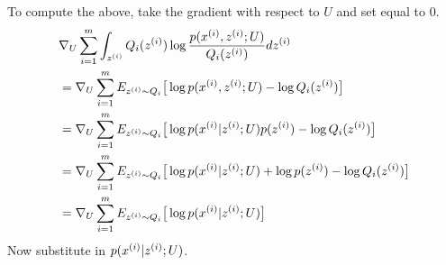 \documentclass[11pt]{article}
\begin{document}
To compute the above, take the gradient with respect to $U$ and set equal to $0$.
\begin{align*}
    &\nabla_U \sum_{i=1}^m \int_{z^{(i)}} Q_i(z^{(i)}) \log \frac{p(x^{(i)},z^{(i)}; U)}{Q_i(z^{(i)})} d z^{(i)} \\
    &= \nabla_U \sum_{i=1}^m E_{z^{(i)} \sim Q_i}\big[ \log p(x^{(i)},z^{(i)}; U) - \log Q_i(z^{(i)}) \big] \\
    &= \nabla_U \sum_{i=1}^m E_{z^{(i)} \sim Q_i}\big[ \log p(x^{(i)}|z^{(i)}; U) p(z^{(i)}) - \log Q_i(z^{(i)}) \big] \\
    &= \nabla_U \sum_{i=1}^m E_{z^{(i)} \sim Q_i}\big[ \log p(x^{(i)}|z^{(i)}; U) + \log p(z^{(i)}) - \log Q_i(z^{(i)}) \big] \\
    &= \nabla_U \sum_{i=1}^m E_{z^{(i)} \sim Q_i}\big[ \log p(x^{(i)}|z^{(i)}; U) \big] \\
\end{align*}
Now substitute in $p(x^{(i)}|z^{(i)}; U)$.
\end{document}
